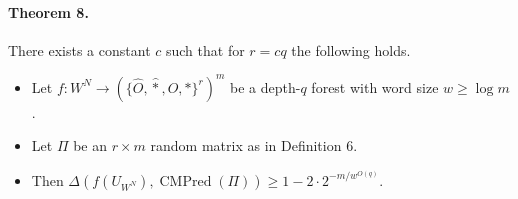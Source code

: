 \paragraph{Theorem 8.}
There exists a constant $c$ such that for $r=cq$ the following holds.
\begin{itemize}
\item Let $f:W^N\to(\{\widehat O,\widehat *,O,*\}^r)^m$ be a depth-$q$ forest with word size $w\geq\log m$.
\item Let $\Pi$ be an $r\times m$ random matrix as in Definition 6.
\item Then $\Delta(f(U_{W^N}),\operatorname{CMPred}(\Pi))\geq1-2\cdot2^{-m/w^{O(q)}}$.
\end{itemize}
